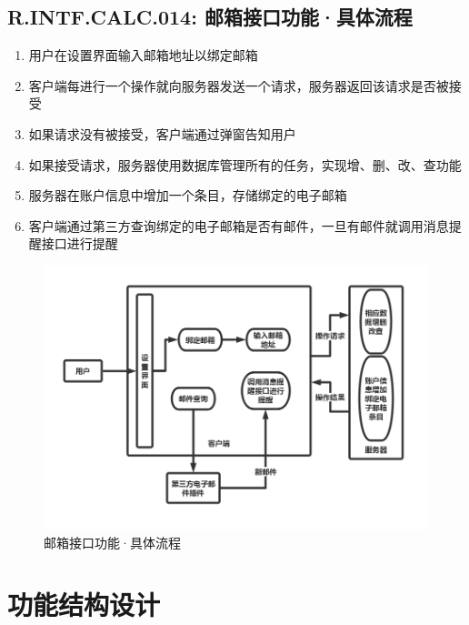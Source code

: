     \subsection{R.INTF.CALC.014: 邮箱接口功能·具体流程}
    \begin{enumerate}
        \item 用户在设置界面输入邮箱地址以绑定邮箱
        \item 客户端每进行一个操作就向服务器发送一个请求，服务器返回该请求是否被接受
        \item 如果请求没有被接受，客户端通过弹窗告知用户
        \item 如果接受请求，服务器使用数据库管理所有的任务，实现增、删、改、查功能
        \item 服务器在账户信息中增加一个条目，存储绑定的电子邮箱
        \item 客户端通过第三方查询绑定的电子邮箱是否有邮件，一旦有邮件就调用消息提醒接口进行提醒
    \end{enumerate}
     \newpage
        \begin{figure}[h]
            \centering
            \includegraphics[scale=0.4]{OutlineDesign/figures/邮箱接口功能·具体流程.png}
            \caption{邮箱接口功能·具体流程}
            \label{fig:server_flow}
        \end{figure}
\section{功能结构设计}
